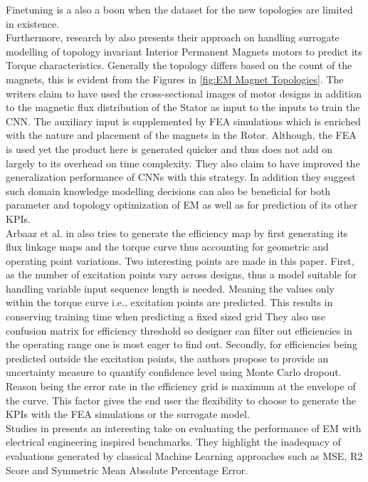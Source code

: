 \documentclass{report} %
\begin{document}
Finetuning is a also a boon when the dataset for the new topologies are limited in existence.\\
Furthermore, research by \cite{EM CNN-2024} also presents their approach on handling surrogate modelling of topology invariant Interior 
Permanent Magnets motors to predict its Torque characteristics.
Generally the topology differs based on the count of the magnets, this is evident from the Figures in \ref{fig:EM Magnet Topologies}.
The writers claim to have used the cross-sectional images of motor designs in addition to the magnetic flux distribution of the Stator as input to the
inputs to train the \ac{CNN}. The auxiliary input is supplemented by \ac{FEA} simulations which is enriched with the nature and placement of 
the magnets in the Rotor. Although, the \ac{FEA} is used yet the product here is generated quicker and thus does not add on largely to its overhead on time complexity. 
They also claim to have improved the generalization performance of \ac{CNN}s with this strategy. In addition they suggest such domain knowledge modelling decisions 
can also be beneficial for both parameter and topology optimization of \ac{EM} as well as for prediction of its other \ac{KPI}s.\\
Arbaaz et al. in \cite{DL-ETA-2019} also tries to generate the efficiency map by first generating its flux linkage maps and the torque curve 
thus accounting for geometric and operating point variations. Two interesting points are made in this paper.
First, as the number of excitation points vary across designs, thus a model suitable for handling variable input sequence length is needed.
Meaning the values only within the torque curve i.e., excitation points are predicted. This results in conserving training time when predicting a fixed sized grid
They also use confusion matrix for efficiency threshold so designer can filter out efficiencies in the operating range one is most eager to find out.
Secondly, for efficiencies being predicted outside the excitation points, the authors propose to provide an uncertainty measure to quantify confidence level using Monte Carlo dropout.
Reason being the error rate in the efficiency grid is maximum at the envelope of the curve. This factor gives the end user 
the flexibility to choose to generate the \ac{KPI}s with the \ac{FEA} simulations or the surrogate model.\\
Studies in \cite{EM-PM-2020} presents an interesting take on evaluating the performance of \ac{EM} with electrical engineering inspired benchmarks.
They highlight the inadequacy of evaluations generated by classical Machine Learning approaches such as \ac{MSE}, R2 Score and Symmetric Mean Absolute Percentage Error.
\end{document}
